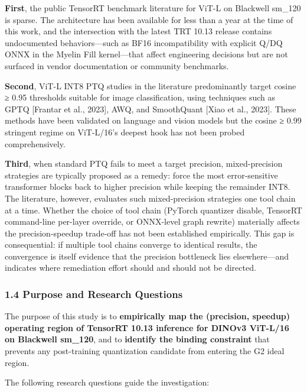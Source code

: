 \documentclass[
]{article}
\begin{document}
\textbf{First}, the public TensorRT benchmark literature for ViT-L on
Blackwell sm\_120 is sparse. The architecture has been available for
less than a year at the time of this work, and the intersection with the
latest TRT 10.13 release contains undocumented behaviors---such as BF16
incompatibility with explicit Q/DQ ONNX in the Myelin Fill kernel---that
affect engineering decisions but are not surfaced in vendor
documentation or community benchmarks.

\textbf{Second}, ViT-L INT8 PTQ studies in the literature predominantly
target cosine ≥ 0.95 thresholds suitable for image classification, using
techniques such as GPTQ {[}Frantar et al., 2023{]}, AWQ, and SmoothQuant
{[}Xiao et al., 2023{]}. These methods have been validated on language
and vision models but the cosine ≥ 0.99 stringent regime on ViT-L/16's
deepest hook has not been probed comprehensively.

\textbf{Third}, when standard PTQ fails to meet a target precision,
mixed-precision strategies are typically proposed as a remedy: force the
most error-sensitive transformer blocks back to higher precision while
keeping the remainder INT8. The literature, however, evaluates such
mixed-precision strategies one tool chain at a time. Whether the choice
of tool chain (PyTorch quantizer disable, TensorRT command-line
per-layer override, or ONNX-level graph rewrite) materially affects the
precision-speedup trade-off has not been established empirically. This
gap is consequential: if multiple tool chains converge to identical
results, the convergence is itself evidence that the precision
bottleneck lies elsewhere---and indicates where remediation effort
should and should not be directed.

\subsubsection{1.4 Purpose and Research
Questions}\label{purpose-and-research-questions}

The purpose of this study is to \textbf{empirically map the (precision,
speedup) operating region of TensorRT 10.13 inference for DINOv3
ViT-L/16 on Blackwell sm\_120}, and to \textbf{identify the binding
constraint} that prevents any post-training quantization candidate from
entering the G2 ideal region.

The following research questions guide the investigation:
\end{document}
